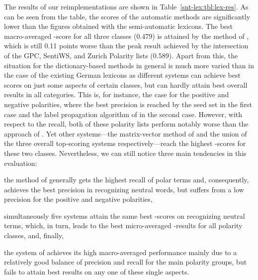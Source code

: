 The results of our reimplementations are shown in
Table~\ref{snt-lex:tbl:lex-res}.  As can be seen from the table, the
scores of the automatic methods are significantly lower than the
figures obtained with the semi-automatic lexicons.  The best
macro-averaged \F{}-score for all three classes (0.479) is attained by
the method of \citet{Blair-Goldensohn:08}, which is still 0.11 points
worse than the peak result achieved by the intersection of the GPC,
SentiWS, and Zurich Polarity lists (0.589).  Apart from this, the
situation for the dictionary-based methods in general is much more
varied than in the case of the existing German lexicons as different
systems can achieve best scores on just some aspects of certain
classes, but can hardly attain best overall results in all categories.
This is, for instance, the case for the positive and negative
polarities, where the best precision is reached by the seed set in the
first case and the label propagation algorithm of \citet{Rao:09} in
the second case.  However, with respect to the recall, both of these
polarity lists perform notably worse than the approach of
\citet{Esuli:06c}.  Yet other systems---the matrix-vector method of
\citet{Blair-Goldensohn:08} and the union of the three overall
top-scoring systems respectively---reach the highest \F{}-scores for
these two classes.  Nevertheless, we can still notice three main
tendencies in this evaluation:
\begin{inparaenum}
\item the method of \citet{Esuli:06c} generally gets the highest
  recall of polar terms and, consequently, achieves the best precision
  in recognizing neutral words, but suffers from a low precision for
  the positive and negative polarities,
\item simultaneously five systems attain the same best \F{}-scores on
  recognizing neutral terms, which, in turn, leads to the best
  micro-averaged \F{}-results for all polarity classes, and, finally,
\item the system of \citet{Blair-Goldensohn:08} achieves its high
  macro-averaged performance mainly due to a relatively good balance
  of precision and recall for the main polarity groups, but fails to
  attain best results on any one of these single aspects.
\end{inparaenum}




